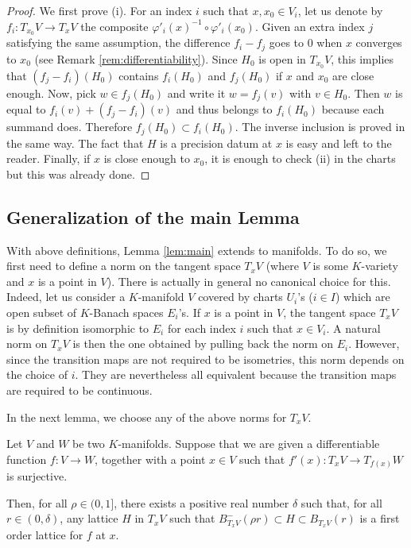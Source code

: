 \documentclass{lms}
\begin{document}
\begin{proof}
We first prove (i). For an index $i$ such that $x, x_0 \in V_i$, let us 
denote by $f_i : T_{x_0} V \to T_x V$ the composite $\varphi'_i(x)^{-1} 
\circ \varphi'_i(x_0)$. Given an extra index $j$ satisfying the same
assumption, the difference $f_i - f_j$ goes to $0$ when $x$ converges to 
$x_0$ (see Remark \ref{rem:differentiability}). Since $H_0$ is open in 
$T_{x_0} V$, this implies that $(f_j - f_i)(H_0)$ contains $f_i(H_0)$ 
and $f_j(H_0)$ if $x$ and $x_0$ are close enough. Now, pick $w \in 
f_j(H_0)$ and write it $w = f_j(v)$ with $v \in H_0$. Then $w$ is equal 
to $f_i(v) + (f_j - f_i)(v)$ and thus belongs to $f_i(H_0)$ because each 
summand does. Therefore $f_j(H_0) \subset f_i(H_0)$. The inverse 
inclusion is proved in the same way. The fact that $H$ is a 
precision datum at $x$ is easy and left to the reader.
Finally, if $x$ is close enough to $x_0$, it is enough to check (ii) in 
the charts but this was already done.
\end{proof}

\subsection{Generalization of the main Lemma}

With above definitions, Lemma \ref{lem:main} extends to 
manifolds. To do so, we first need to define 
a norm on the tangent space $T_x V$ (where $V$ is some $K$-variety and 
$x$ is a point in $V$). There is actually in general no canonical choice 
for this. Indeed, let us consider a $K$-manifold $V$ covered by charts 
$U_i$'s ($i \in I$) which are open subset of $K$-Banach spaces $E_i$'s. If $x$ 
is a point in $V$, the tangent space $T_x V$ is by definition isomorphic 
to $E_i$ for each index $i$ such that $x \in V_i$. A natural norm on 
$T_x V$ is then the one obtained by pulling back the norm on $E_i$. 
However, since the transition maps are not required to be isometries, 
this norm depends on the choice of $i$. They are nevertheless all
equivalent because the transition maps are required to be continuous.

In the next lemma, we choose any of the above norms for $T_x V$.

\begin{lem}
Let $V$ and $W$ be two $K$-manifolds. 
Suppose that we are given a differentiable function $f : V \to W$, 
together with a point $x \in V$ such that $f'(x) : T_x V \to T_{f(x)} W$ 
is surjective. 

Then, for all $\rho \in (0, 1]$, there exists a positive real 
number $\delta$ such that, for all $r \in (0, \delta)$, any lattice
$H$ in $T_x V$ such that $B^-_{T_x V}(\rho r) \subset H \subset 
B^{\phantom -}_{T_x V}(r)$ is a first
order lattice for $f$ at $x$.
\end{lem}
\end{document}
